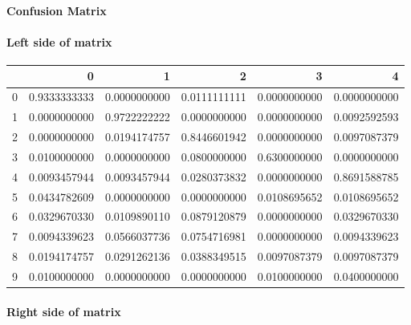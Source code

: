 \paragraph{Confusion Matrix}
\paragraph{Left side of matrix}

\begin{tabular}{l|r|r|r|r|r}
 & 0 & 1 & 2 & 3 & 4 \\
\hline
0 & 0.9333333333 & 0.0000000000 & 0.0111111111 & 0.0000000000 & 0.0000000000 \\
1 & 0.0000000000 & 0.9722222222 & 0.0000000000 & 0.0000000000 & 0.0092592593 \\
2 & 0.0000000000 & 0.0194174757 & 0.8446601942 & 0.0000000000 & 0.0097087379 \\
3 & 0.0100000000 & 0.0000000000 & 0.0800000000 & 0.6300000000 & 0.0000000000 \\
4 & 0.0093457944 & 0.0093457944 & 0.0280373832 & 0.0000000000 & 0.8691588785 \\
5 & 0.0434782609 & 0.0000000000 & 0.0000000000 & 0.0108695652 & 0.0108695652 \\
6 & 0.0329670330 & 0.0109890110 & 0.0879120879 & 0.0000000000 & 0.0329670330 \\
7 & 0.0094339623 & 0.0566037736 & 0.0754716981 & 0.0000000000 & 0.0094339623 \\
8 & 0.0194174757 & 0.0291262136 & 0.0388349515 & 0.0097087379 & 0.0097087379 \\
9 & 0.0100000000 & 0.0000000000 & 0.0000000000 & 0.0100000000 & 0.0400000000 \\
\end{tabular}

\paragraph{Right side of matrix}

